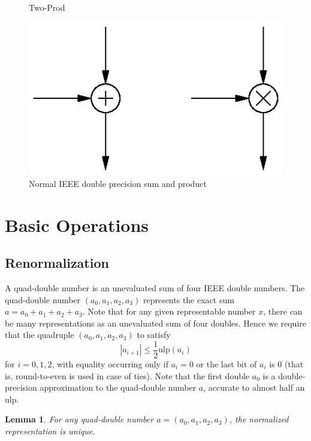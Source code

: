 \documentclass[11pt]{article}
\newtheorem{lem}[thm]{Lemma}
\theoremstyle{definition}
\newcommand{\ulp}{\mathrm{ulp}}
\begin{document}
\begin{figure}
\begin{minipage}[t]{2in}
\begin{center}
      \caption{\label{two_prod_fig}{\sc Two-Prod}}
    \end{center}
  \end{minipage}
\end{figure}

\begin{figure}
  \begin{center}
    \includegraphics{normal_sum_prod.eps}
    \caption{\label{normal_sum_prod_fig}Normal IEEE double precision sum and product}
  \end{center}
\end{figure}

\section{Basic Operations} \label{sec:basic}
\subsection{Renormalization}
A quad-double number is an unevaluated sum of four IEEE double numbers.
The quad-double number $(a_0, a_1, a_2, a_3)$ represents the exact
sum $a = a_0 + a_1 + a_2 + a_3$.  Note that for any given representable
number $x$, there can be many representations as an unevaluated sum of
four doubles.  Hence we require that the quadruple $(a_0, a_1, a_2, a_3)$
to satisfy
\begin{displaymath}
  |a_{i+1}| \le \frac{1}{2}\ulp(a_i)  
\end{displaymath}
for $i = 0, 1, 2$, with equality occurring only if $a_i = 0$ or 
the last bit of $a_i$ is $0$ (that is, round-to-even is used in case
of ties).  Note that the first double $a_0$ is a double-precision
approximation to the quad-double number $a$, accurate to almost
half an ulp.

\begin{lem}
  For any quad-double number $a = (a_0, a_1, a_2, a_3)$, the normalized 
  representation is unique.
\end{lem}
\end{document}
